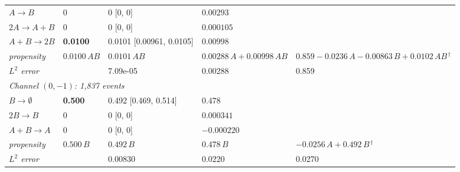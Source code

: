 \begin{table}[htbp]
\begin{tabular}{l l l l l}
\quad $A\to B$ & $0$ & 0 [0, 0] & $0.00293$ &  \\
\quad $2A\to A+B$ & $0$ & 0 [0, 0] & $0.000105$ &  \\
\quad $A+B\to 2B$ & \textbf{0.0100} & 0.0101 [0.00961, 0.0105] & $0.00998$ &  \\
\qquad\quad \textit{propensity} & $0.0100\,AB$ & $0.0101\,AB$ & $0.00288\,A + 0.00998\,AB$ & $0.859 - 0.0236\,A - 0.00863\,B + 0.0102\,AB{}^{\,\dagger}$ \\
\qquad\quad \textit{$L^2$ error} & & 7.09e-05 & 0.00288 & 0.859 \\
\midrule
\multicolumn{5}{l}{\textit{Channel $(0,-1)$: 1{,}837 events}} \\
\quad $B\to \emptyset$ & \textbf{0.500} & 0.492 [0.469, 0.514] & $0.478$ &  \\
\quad $2B\to B$ & $0$ & 0 [0, 0] & $0.000341$ &  \\
\quad $A+B\to A$ & $0$ & 0 [0, 0] & $-0.000220$ &  \\
\qquad\quad \textit{propensity} & $0.500\,B$ & $0.492\,B$ & $0.478\,B$ & $-0.0256\,A + 0.492\,B{}^{\,\dagger}$ \\
\qquad\quad \textit{$L^2$ error} & & 0.00830 & 0.0220 & 0.0270 \\
\bottomrule
\end{tabular}
\end{table}

